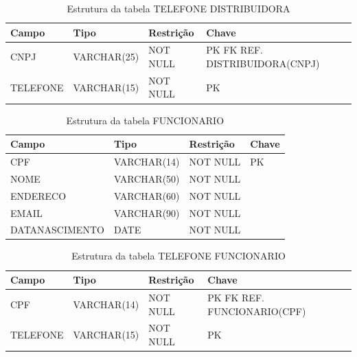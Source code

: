 \documentclass[11pt]{article}
\begin{document}
\begin{table}[H]
\centering
\caption{Estrutura da tabela TELEFONE DISTRIBUIDORA}
\begin{tabular}{
    p{4.5cm}  %
    p{3cm}  %
    p{2cm}  %
    p{3cm}  %
}
\toprule
\textbf{Campo} & \textbf{Tipo} & \textbf{Restrição} & \textbf{Chave} \\
\midrule
CNPJ & VARCHAR(25) & NOT NULL & PK FK REF. DISTRIBUIDORA(CNPJ)\\
TELEFONE & VARCHAR(15) & NOT NULL & PK\\
\bottomrule
\end{tabular}
\end{table}

\begin{table}[H]
\centering
\caption{Estrutura da tabela FUNCIONARIO}
\begin{tabular}{
    p{4.5cm}  %
    p{3cm}  %
    p{2cm}  %
    p{3cm}  %
}
\toprule
\textbf{Campo} & \textbf{Tipo} & \textbf{Restrição} & \textbf{Chave} \\
\midrule
CPF & VARCHAR(14) & NOT NULL & PK \\
NOME & VARCHAR(50) & NOT NULL & \\
ENDERECO & VARCHAR(60) & NOT NULL & \\
EMAIL & VARCHAR(90) & NOT NULL & \\
DATANASCIMENTO & DATE & NOT NULL & \\
\bottomrule
\end{tabular}
\end{table}

\begin{table}[H]
\centering
\caption{Estrutura da tabela TELEFONE FUNCIONARIO}
\begin{tabular}{
    p{4.5cm}  %
    p{3cm}  %
    p{2cm}  %
    p{3cm}  %
}
\toprule
\textbf{Campo} & \textbf{Tipo} & \textbf{Restrição} & \textbf{Chave}\\
\midrule
CPF & VARCHAR(14) & NOT NULL & PK FK REF. FUNCIONARIO(CPF) \\
TELEFONE & VARCHAR(15) & NOT NULL & PK\\
\bottomrule
\end{tabular}
\end{table}
\end{document}
